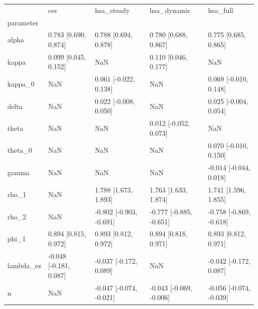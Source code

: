 \begin{tabular}{lllll}
\toprule
 & ces & hsa\_steady & hsa\_dynamic & hsa\_full \\
parameter &  &  &  &  \\
\midrule
alpha & 0.783 [0.690, 0.874] & 0.788 [0.694, 0.878] & 0.780 [0.688, 0.867] & 0.775 [0.685, 0.865] \\
kappa & 0.099 [0.045, 0.152] & NaN & 0.110 [0.046, 0.177] & NaN \\
kappa\_0 & NaN & 0.061 [-0.022, 0.138] & NaN & 0.069 [-0.010, 0.148] \\
delta & NaN & 0.022 [-0.008, 0.050] & NaN & 0.025 [-0.004, 0.054] \\
theta & NaN & NaN & 0.012 [-0.052, 0.073] & NaN \\
theta\_0 & NaN & NaN & NaN & 0.070 [-0.010, 0.150] \\
gamma & NaN & NaN & NaN & -0.014 [-0.044, 0.018] \\
rho\_1 & NaN & 1.788 [1.673, 1.893] & 1.763 [1.633, 1.874] & 1.741 [1.596, 1.855] \\
rho\_2 & NaN & -0.802 [-0.903, -0.691] & -0.777 [-0.885, -0.651] & -0.758 [-0.869, -0.618] \\
phi\_1 & 0.894 [0.815, 0.972] & 0.893 [0.812, 0.972] & 0.894 [0.818, 0.971] & 0.893 [0.812, 0.971] \\
lambda\_ez & -0.048 [-0.181, 0.087] & -0.037 [-0.172, 0.089] & NaN & -0.042 [-0.172, 0.087] \\
n & NaN & -0.047 [-0.074, -0.021] & -0.043 [-0.069, -0.006] & -0.056 [-0.074, -0.039] \\
\bottomrule
\end{tabular}
